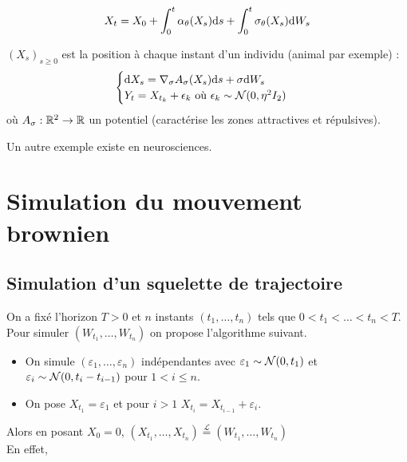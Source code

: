 \[ X_t = X_0 + \int_{0}^{t} \alpha_\theta(X_s) \mathrm{d} s + \int_{0}^{t} \sigma_\theta(X_s) \mathrm{d} W_s \]

\begin{ex}
  $(X_s)_{s \geq 0}$ est la position à chaque instant d'un individu (animal par exemple) :
  \[
    \begin{cases}
      \mathrm{d} X_s = \nabla_\sigma A_\sigma(X_s) \mathrm{d} s + \sigma \mathrm{d} W_s \\
      Y_t = X_{t_k} + \epsilon_k \text{ où } \epsilon_k \sim \mathcal{N}(0, \eta^2 I_2)
    \end{cases}
  \]
  où $A_\sigma : \mathbb{R}^2 \to \mathbb{R}$ un \og potentiel \fg{} (caractérise les zones attractives et répulsives).
\end{ex}

Un autre exemple existe en neurosciences.

\section{Simulation du mouvement brownien}

\subsection{Simulation d'un squelette de trajectoire}

On a fixé l'horizon $T>0$ et $n$ instants $(t_1,\ldots,t_n)$ tels que $0 < t_1 <\ldots <t_n < T$. Pour simuler $(W_{t_1}, \ldots, W_{t_n})$ on propose l'algorithme suivant.
\begin{itemize}
  \item On simule $(\varepsilon_1, \ldots, \varepsilon_n)$ indépendantes avec $\varepsilon_1 \sim \mathcal{N}(0,t_1)$ et $\varepsilon_i \sim \mathcal{N}(0, t_i - t_{i-1})$ pour $1 < i \leq n$.
  \item On pose $X_{t_1} = \varepsilon_1$ et pour $i>1$ $X_{t_i} = X_{t_{i-1}} + \varepsilon_i$.
\end{itemize}
Alors en posant $X_0 = 0$, $(X_{t_1}, \ldots, X_{t_n}) \overset{\mathcal{L}}{=} (W_{t_1}, \ldots, W_{t_n})$ \\

En effet, 

